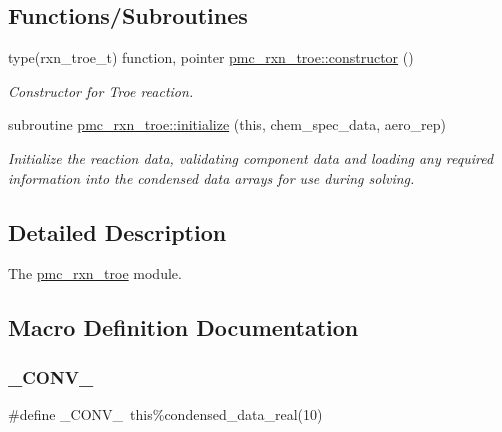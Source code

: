 \subsection*{Functions/\+Subroutines}
\begin{DoxyCompactItemize}
\item 
type(rxn\+\_\+troe\+\_\+t) function, pointer \mbox{\hyperlink{namespacepmc__rxn__troe_ae4ef42701effb43e507e4c34864821a1}{pmc\+\_\+rxn\+\_\+troe\+::constructor}} ()
\begin{DoxyCompactList}\small\item\em Constructor for Troe reaction. \end{DoxyCompactList}\item 
subroutine \mbox{\hyperlink{namespacepmc__rxn__troe_a2a488c58d4247b8a4e876feb6686b150}{pmc\+\_\+rxn\+\_\+troe\+::initialize}} (this, chem\+\_\+spec\+\_\+data, aero\+\_\+rep)
\begin{DoxyCompactList}\small\item\em Initialize the reaction data, validating component data and loading any required information into the condensed data arrays for use during solving. \end{DoxyCompactList}\end{DoxyCompactItemize}


\subsection{Detailed Description}
The \mbox{\hyperlink{namespacepmc__rxn__troe}{pmc\+\_\+rxn\+\_\+troe}} module. 



\subsection{Macro Definition Documentation}
\mbox{\label{rxn__troe_8_f90_a8d22506f8671e195690022c44d319caf}} 
\subsubsection{\texorpdfstring{\+\_\+\+C\+O\+N\+V\+\_\+}{\_CONV\_}}
{\footnotesize\ttfamily \#define \+\_\+\+C\+O\+N\+V\+\_\+~this\%condensed\+\_\+data\+\_\+real(10)}

